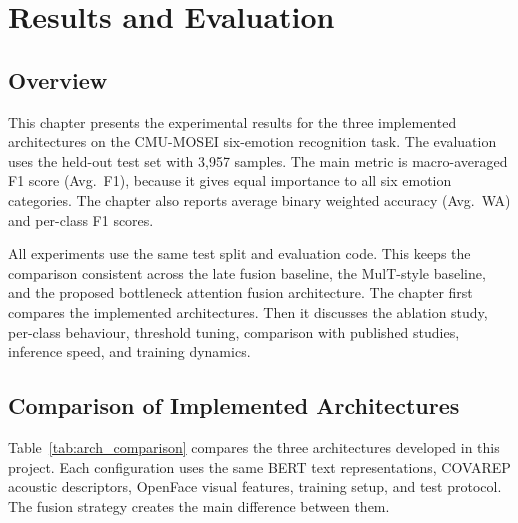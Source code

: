 
\chapter{Results and Evaluation}
\label{chap:results}

\setlength{\parskip}{1em}

\section{Overview}

This chapter presents the experimental results for the three implemented architectures on the CMU-MOSEI six-emotion recognition task. The evaluation uses the held-out test set with 3,957 samples. The main metric is macro-averaged F1 score (Avg.~F1), because it gives equal importance to all six emotion categories. The chapter also reports average binary weighted accuracy (Avg.~WA) and per-class F1 scores.

All experiments use the same test split and evaluation code. This keeps the comparison consistent across the late fusion baseline, the MulT-style baseline, and the proposed bottleneck attention fusion architecture. The chapter first compares the implemented architectures. Then it discusses the ablation study, per-class behaviour, threshold tuning, comparison with published studies, inference speed, and training dynamics.

\section{Comparison of Implemented Architectures}
\label{sec:arch_comparison}

Table~\ref{tab:arch_comparison} compares the three architectures developed in this project. Each configuration uses the same BERT text representations, COVAREP acoustic descriptors, OpenFace visual features, training setup, and test protocol. The fusion strategy creates the main difference between them.

